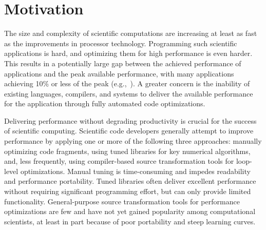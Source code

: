 \section{Motivation}
\label{sec:motivation}


The size and complexity of scientific computations are increasing at
least as fast as the improvements in processor technology.
Programming such scientific applications is hard, and optimizing them
for high performance is even harder.  This results in a potentially
large gap between the achieved performance of applications and the
peak available performance, with many applications achieving 10\% or
less of the peak (e.g.,~\cite{Oliker,conf/vecpar/CarterOS06}).  A
greater concern is the inability of existing languages, compilers, and
systems to deliver the available performance for the application
through fully automated code optimizations.

Delivering performance without degrading productivity is crucial for
the success of scientific computing. Scientific code developers
generally attempt to improve performance by applying one or more of
the following three approaches: manually optimizing code fragments,
using tuned libraries for key numerical algorithms, and, less
frequently, using compiler-based source transformation tools for
loop-level optimizations. Manual tuning is time-consuming and impedes
readability and performance portability. Tuned libraries often deliver
excellent performance without requiring significant programming effort,
but can only provide limited functionality. General-purpose source
transformation tools for performance optimizations are few and have
not yet gained popularity among computational scientists, at least in
part because of poor portability and steep learning curves.
